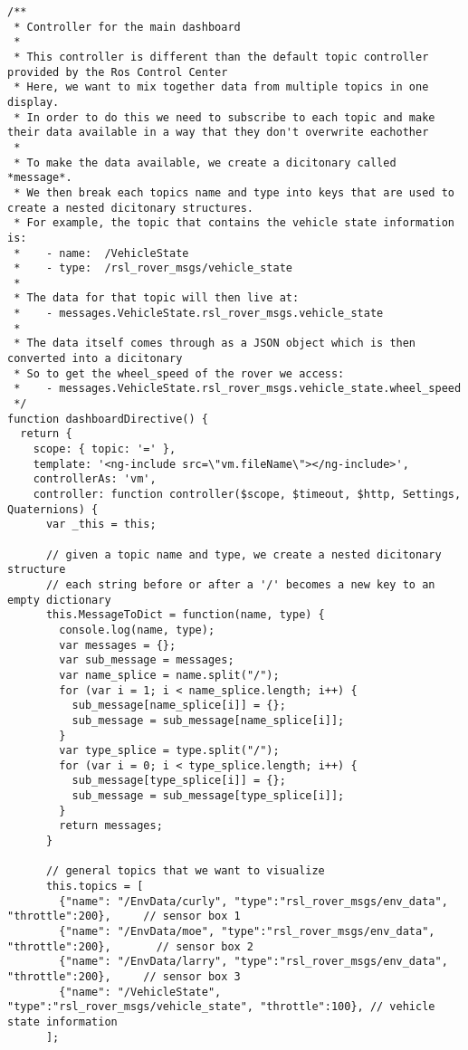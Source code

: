 \begin{verbatim}
/**
 * Controller for the main dashboard
 *
 * This controller is different than the default topic controller provided by the Ros Control Center
 * Here, we want to mix together data from multiple topics in one display.
 * In order to do this we need to subscribe to each topic and make their data available in a way that they don't overwrite eachother
 *
 * To make the data available, we create a dicitonary called *message*.
 * We then break each topics name and type into keys that are used to create a nested dicitonary structures.
 * For example, the topic that contains the vehicle state information is:
 *    - name:  /VehicleState
 *    - type:  /rsl_rover_msgs/vehicle_state
 *
 * The data for that topic will then live at:
 *    - messages.VehicleState.rsl_rover_msgs.vehicle_state
 *
 * The data itself comes through as a JSON object which is then converted into a dicitonary
 * So to get the wheel_speed of the rover we access:
 *    - messages.VehicleState.rsl_rover_msgs.vehicle_state.wheel_speed
 */
function dashboardDirective() {
  return {
    scope: { topic: '=' },
    template: '<ng-include src=\"vm.fileName\"></ng-include>',
    controllerAs: 'vm',
    controller: function controller($scope, $timeout, $http, Settings, Quaternions) {
      var _this = this;

      // given a topic name and type, we create a nested dicitonary structure
      // each string before or after a '/' becomes a new key to an empty dictionary
      this.MessageToDict = function(name, type) {
        console.log(name, type);
        var messages = {};
        var sub_message = messages;
        var name_splice = name.split("/");
        for (var i = 1; i < name_splice.length; i++) {
          sub_message[name_splice[i]] = {};
          sub_message = sub_message[name_splice[i]];
        }
        var type_splice = type.split("/");
        for (var i = 0; i < type_splice.length; i++) {
          sub_message[type_splice[i]] = {};
          sub_message = sub_message[type_splice[i]];
        }
        return messages;
      }

      // general topics that we want to visualize
      this.topics = [
        {"name": "/EnvData/curly", "type":"rsl_rover_msgs/env_data", "throttle":200},     // sensor box 1
        {"name": "/EnvData/moe", "type":"rsl_rover_msgs/env_data", "throttle":200},       // sensor box 2
        {"name": "/EnvData/larry", "type":"rsl_rover_msgs/env_data", "throttle":200},     // sensor box 3
        {"name": "/VehicleState", "type":"rsl_rover_msgs/vehicle_state", "throttle":100}, // vehicle state information
      ];
     

\end{verbatim}
